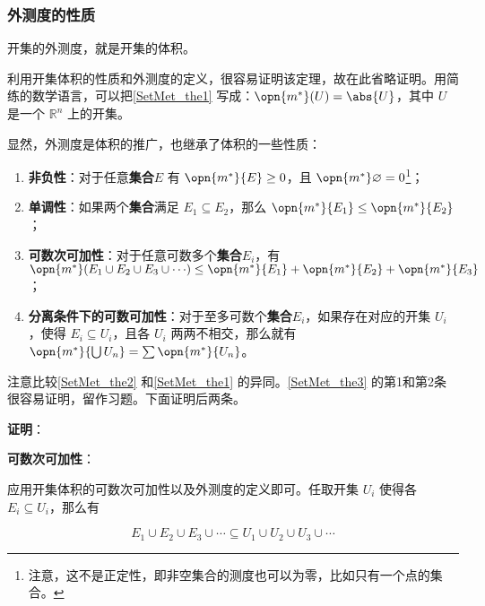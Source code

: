 \subsubsection{外测度的性质}

\begin{theorem}{}\label{SetMet_the1}
开集的外测度，就是开集的体积。
\end{theorem}

利用开集体积的性质和外测度的定义，很容易证明该定理，故在此省略证明。用简练的数学语言，可以把\autoref{SetMet_the1} 写成：$\opn{m^*}(U)=\abs{U}$，其中 $U$ 是一个 $\mathbb{R}^n$ 上的开集。

显然，外测度是体积的推广，也继承了体积的一些性质：

\begin{theorem}{}\label{SetMet_the3}
\begin{enumerate}
\item \textbf{非负性}：对于任意\textbf{集合}$E$ 有 $\opn{m^*}{E}\geq 0$，且 $\opn{m^*}\varnothing=0$\footnote{注意，这不是正定性，即非空集合的测度也可以为零，比如只有一个点的集合。}；\\
\item \textbf{单调性}：如果两个\textbf{集合}满足 $E_1\subseteq E_2$，那么 $\opn{m^*}{E_1}\leq \opn{m^*}{E_2}$；\\
\item \textbf{可数次可加性}：对于任意可数多个\textbf{集合}$E_i$，有 $\opn{m^*}({E_1\cup E_2\cup E_3\cup \cdots})\leq \opn{m^*}{E_1}+\opn{m^*}{E_2}+\opn{m^*}{E_3}$；\\
\item \textbf{分离条件下的可数可加性}：对于至多可数个\textbf{集合}$E_i$，如果存在对应的开集 $U_i$，使得 $E_i\subseteq U_i$，且各 $U_i$ 两两不相交，那么就有 $\opn{m^*}{\bigcup U_n}=\sum\opn{m^*}{U_n}$。
\end{enumerate}
\end{theorem}

注意比较\autoref{SetMet_the2} 和\autoref{SetMet_the1} 的异同。\autoref{SetMet_the3} 的第1和第2条很容易证明，留作习题。下面证明后两条。

\textbf{证明}：

\textbf{可数次可加性}：

应用开集体积的可数次可加性以及外测度的定义即可。任取开集 $U_i$ 使得各 $E_i\subseteq U_i$，那么有

\begin{equation}
E_1\cup E_2\cup E_3\cup \cdots \subseteq U_1\cup U_2\cup U_3\cup \cdots
\end{equation}

